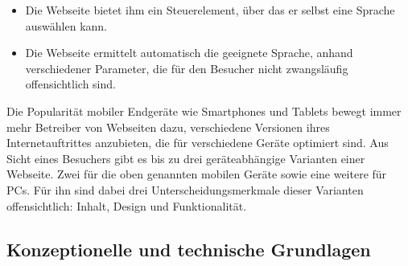             \begin{itemize}
                \item   Die Webseite bietet ihm ein Steuerelement,
                        über das er selbst eine Sprache auswählen kann.
                \item   Die Webseite ermittelt automatisch die geeignete Sprache,
                        anhand verschiedener Parameter, die für den Besucher nicht zwangsläufig
                        offensichtlich sind.
            \end{itemize}

            Die Popularität mobiler Endgeräte wie Smartphones und Tablets
            bewegt immer mehr Betreiber von Webseiten dazu,
            verschiedene Versionen ihres Internetauftrittes anzubieten,
            die für verschiedene Geräte optimiert sind.
            Aus Sicht eines Besuchers gibt es bis zu drei geräteabhängige
            Varianten einer Webseite. Zwei für die oben genannten mobilen Geräte
            sowie eine weitere für PCs.
            Für ihn sind dabei drei Unterscheidungsmerkmale dieser Varianten offensichtlich:
            Inhalt, Design und Funktionalität.
            

        \subsection{Konzeptionelle und technische Grundlagen}